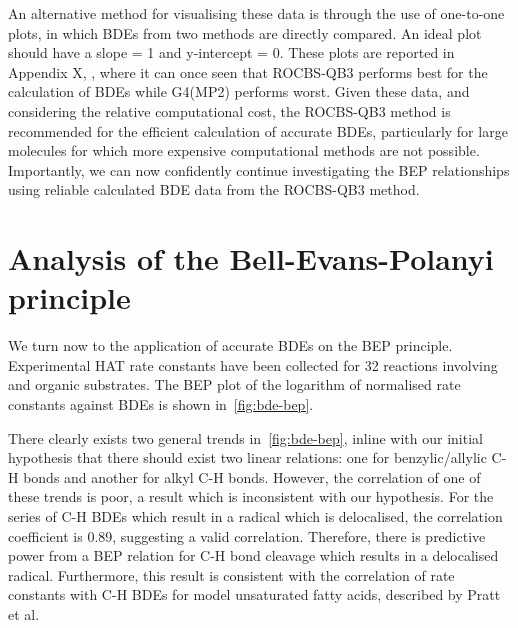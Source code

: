 An alternative method for visualising these data is through the use of one-to-one plots, in which BDEs from two methods are directly compared. An ideal plot should have a slope = 1 and y-intercept = 0. These plots are reported in Appendix X, , where it can once seen that ROCBS-QB3 performs best for the calculation of BDEs while G4(MP2) performs worst. Given these data, and considering the relative computational cost, the ROCBS-QB3 method is recommended for the efficient calculation of accurate BDEs, particularly for large molecules for which more expensive computational methods are not possible. Importantly, we can now confidently continue investigating the BEP relationships using reliable calculated BDE data from the ROCBS-QB3 method.

\section{Analysis of the Bell-Evans-Polanyi principle}

We turn now to the application of accurate BDEs on the BEP principle. Experimental HAT rate constants have been collected for 32 reactions involving \cumo and organic substrates. The BEP plot of the logarithm of normalised rate constants against BDEs is shown in~\ref{fig:bde-bep}.

There clearly exists two general trends in~\ref{fig:bde-bep}, inline with our initial hypothesis that there should exist two linear relations: one for benzylic/allylic C-H bonds and another for alkyl C-H bonds. However, the correlation of one of these trends is poor, a result which is inconsistent with our hypothesis. For the series of C-H BDEs which result in a radical which is delocalised, the correlation coefficient is 0.89, suggesting a valid correlation. Therefore, there is predictive power from a BEP relation for C-H bond cleavage which results in a delocalised radical. Furthermore, this result is consistent with the correlation of rate constants with C-H BDEs for model unsaturated fatty acids, described by Pratt et al.\cite{Pratt2003}

